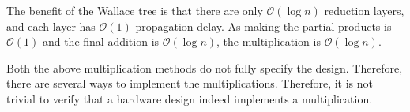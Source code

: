 The benefit of the Wallace tree is that there are only $\mathcal{O}(\log n)$ reduction layers, and each layer has $\mathcal{O}(1)$ propagation delay. As making the partial products is $\mathcal{O}(1)$ and the final addition is $\mathcal{O}(\log n)$, the multiplication is $\mathcal{O}(\log n)$.

Both the above multiplication methods do not
fully specify the design.
%
Therefore, there are several ways to implement the multiplications.
%
Therefore, it is not trivial to verify that a hardware design indeed
implements a multiplication.




